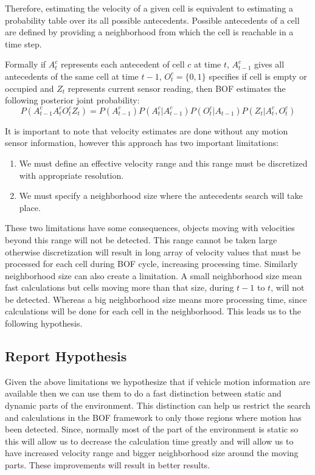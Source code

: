 Therefore, estimating the velocity of a given cell is equivalent to estimating a probability table over its all possible antecedents. Possible antecedents of a cell are defined by providing a neighborhood from which the cell is reachable in a time step.

Formally if $A_t^c$ represents each antecedent of cell $c$ at time $t$, $A_{t-1}^c$ gives all antecedents of the same cell at time $t-1$, $O_t^c=\{0,1\}$ specifies if cell is empty or occupied and $Z_t$ represents current sensor reading, then BOF estimates the following posterior joint probability:
\begin{equation}
P(A_{t-1}^c A_t^c O_t^c Z_t) = P(A_{t-1}^c)P(A_t^c|A_{t-1}^c)P(O_t^c|A_{t-1})P(Z_t|A_t^c,O_t^c)
\end{equation}

It is important to note that velocity estimates are done without any motion sensor information, however this approach has two important limitations:
\begin{enumerate}
\item We must define an effective velocity range and this range must be discretized with appropriate resolution.
\item We must specify a neighborhood size where the antecedents search will take place.
\end{enumerate}
These two limitations have some consequences, objects moving with velocities beyond this range will not be detected. This range cannot be taken large otherwise discretization will result in long array of velocity values that must be processed for each cell during BOF cycle, increasing processing time. Similarly neighborhood size can also create a limitation. A small neighborhood size mean fast calculations but cells moving more than that size, during $t-1$ to $t$, will not be detected. Whereas a big neighborhood size means more processing time, since calculations will be done for each cell in the neighborhood. This leads us to the following hypothesis.

\subsection{Report Hypothesis}
Given the above limitations we hypothesize that if vehicle motion information are available then we can use them to do a fast distinction between static and dynamic parts of the environment. This distinction can help us restrict the search and calculations in the BOF framework to only those regions where motion has been detected. Since, normally most of the part of the environment is static so this will allow us to decrease the calculation time greatly and will allow us to have increased velocity range and bigger neighborhood size around the moving parts. These improvements will result in better results.

